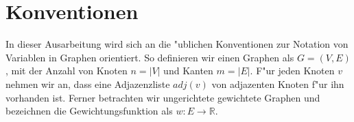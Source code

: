 \section{Konventionen}
In dieser Ausarbeitung wird sich an die "ublichen Konventionen zur Notation
    von Variablen in Graphen orientiert. So definieren wir einen Graphen als
    $G = (V,E)$, mit der Anzahl von Knoten $n = |V|$ und Kanten $m = |E|$.
    F"ur jeden Knoten $v$ nehmen wir an, dass eine Adjazenzliste $adj(v)$ von
    adjazenten Knoten f"ur ihn vorhanden ist.
    Ferner betrachten wir ungerichtete gewichtete Graphen und bezeichnen 
    die Gewichtungsfunktion als $w: E \rightarrow \mathbb{R}$.\\
